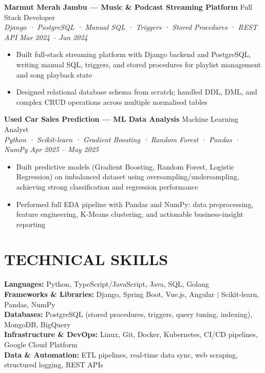 \documentclass[10pt,a4paper]{article}
\newcommand{\experienceheader}[4]{
    \textbf{#1} \hfill #2 \\
    \textit{#3} \hfill \textit{#4}
}
\begin{document}
\experienceheader{Marmut Merah Jambu — Music \& Podcast Streaming Platform}{Full Stack Developer}{Django · PostgreSQL · Manual SQL · Triggers · Stored Procedures · REST API}{Mar 2024 -- Jun 2024}
\begin{itemize}[leftmargin=*, itemsep=0.5pt, topsep=1pt]
    \item Built full-stack streaming platform with Django backend and PostgreSQL, writing manual SQL, triggers, and stored procedures for playlist management and song playback state
    \item Designed relational database schema from scratch; handled DDL, DML, and complex CRUD operations across multiple normalised tables
\end{itemize}

\vspace{2pt}

\experienceheader{Used Car Sales Prediction — ML Data Analysis}{Machine Learning Analyst}{Python · Scikit-learn · Gradient Boosting · Random Forest · Pandas · NumPy}{Apr 2025 -- May 2025}
\begin{itemize}[leftmargin=*, itemsep=0.5pt, topsep=1pt]
    \item Built predictive models (Gradient Boosting, Random Forest, Logistic Regression) on imbalanced dataset using oversampling/undersampling, achieving strong classification and regression performance
    \item Performed full EDA pipeline with Pandas and NumPy: data preprocessing, feature engineering, K-Means clustering, and actionable business-insight reporting
\end{itemize}

\vspace{-4pt}

\section*{TECHNICAL SKILLS}

\textbf{Languages:} Python, TypeScript/JavaScript, Java, SQL, Golang \\
\textbf{Frameworks \& Libraries:} Django, Spring Boot, Vue.js, Angular $|$ Scikit-learn, Pandas, NumPy \\
\textbf{Databases:} PostgreSQL (stored procedures, triggers, query tuning, indexing), MongoDB, BigQuery \\
\textbf{Infrastructure \& DevOps:} Linux, Git, Docker, Kubernetes, CI/CD pipelines, Google Cloud Platform \\
\textbf{Data \& Automation:} ETL pipelines, real-time data sync, web scraping, structured logging, REST APIs
\end{document}
